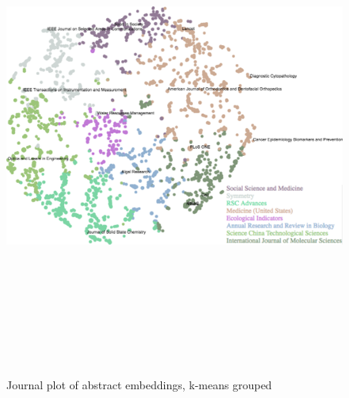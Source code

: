 \documentclass[../../paper.tex]{subfiles}
\begin{document}
\begin{landscape}
\begin{figure}
\begin{center}
\includegraphics[height=6.5in]{Plots/Journal_Plots/Abstract_grouped}
\end{center}
\caption{Journal plot of abstract embeddings, k-means grouped}\label{figure:abstractPlotGrouped}
\end{figure}
\end{landscape}
\end{document}

